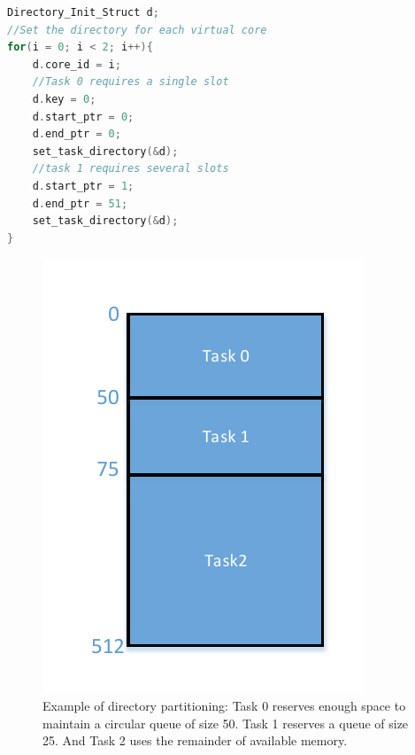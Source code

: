 \begin{lstlisting}[frame=single,language=C,label=l:dir_init,caption=Initializing the Comparator directory.]
Directory_Init_Struct d;
//Set the directory for each virtual core
for(i = 0; i < 2; i++){
	d.core_id = i;
	//Task 0 requires a single slot
	d.key = 0;
	d.start_ptr = 0;
	d.end_ptr = 0;
	set_task_directory(&d);
	//task 1 requires several slots
	d.start_ptr = 1;
	d.end_ptr = 51;
	set_task_directory(&d);
}
\end{lstlisting}


\begin{figure}[ht]
\centering
\includegraphics[scale=0.8]{Figures/directory}
\caption[Example of directory partitioning]{Example of directory partitioning: Task 0 reserves enough space to maintain a circular queue of size 50. Task 1 reserves a queue of size 25. And Task 2 uses the remainder of available memory.}
\label{f:directory}
\end{figure}

